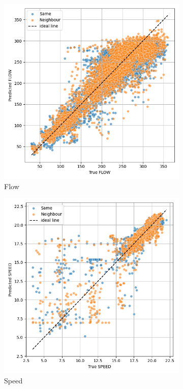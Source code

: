 		\begin{figure}[H]
		\centering
		\begin{subfigure}{0.49 \linewidth}
			\includegraphics[width=\textwidth]{../Plots/Flow/samevsneighbour}
			\caption{Flow}
		\end{subfigure}
		\begin{subfigure}{0.49 \linewidth}
			\includegraphics[width=\textwidth]{../Plots/Speed/samevsneighbour}
			\caption{Speed}
		\end{subfigure}
		\caption{}
		\label{fig:samevsneighbour}
	\end{figure}
	
